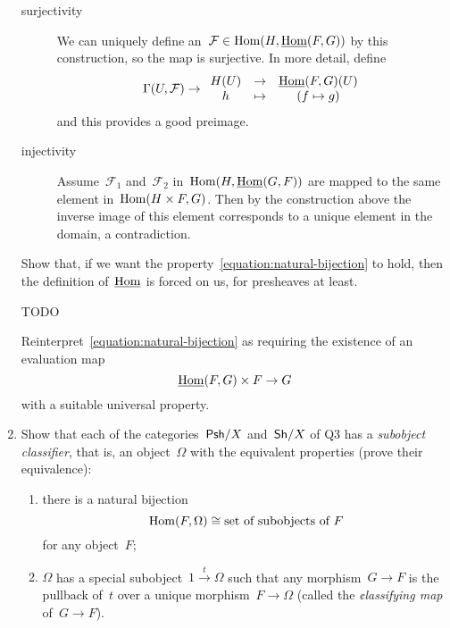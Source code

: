 \documentclass[a4paper,11pt,oneside,openany,article]{memoir}
\begin{document}
\begin{enumerate}
\begin{solution}
      \begin{description}
        \item[surjectivity] We can uniquely define an~$\mathcal{F}\in\operatorname{Hom}(H,\underline{\operatorname{Hom}}(F,G))$ by this construction, so the map is surjective. In more detail, define
          \begin{equation}
            \mathrm{\Gamma}(U,\mathcal{F})\to
            \begin{array}{ccc}
              H(U)&\to&\underline{\operatorname{Hom}}(F,G)(U) \\
              h&\mapsto& \left( f\mapsto g \right)
            \end{array}
          \end{equation}
          and this provides a good preimage.
        \item[injectivity] Assume~$\mathcal{F}_1$ and~$\mathcal{F}_2$ in~$\operatorname{Hom}(H,\underline{\operatorname{Hom}}(G,F))$ are mapped to the same element in~$\operatorname{Hom}(H\times F,G)$. Then by the construction above the inverse image of this element corresponds to a unique element in the domain, a contradiction.
      \end{description}
    \end{solution}

    Show that, if we want the property~\eqref{equation:natural-bijection} to hold, then the definition of~$\underline{\operatorname{Hom}}$ is forced on us, for presheaves at least.

    \begin{solution}
      TODO
    \end{solution}

    Reinterpret~\eqref{equation:natural-bijection} as requiring the existence of an evaluation map
    \begin{equation}
      \underline{\operatorname{Hom}}(F,G)\times F\to G
    \end{equation}
    with a suitable universal property.

  \item Show that each of the categories~$\mathsf{Psh}/X$ and~$\mathsf{Sh}/X$ of Q3 has a \emph{subobject classifier}, that is, an object~$\Omega$ with the equivalent properties (prove their equivalence):
    \begin{enumerate}
      \item\label{subobject-1} there is a natural bijection
        \begin{equation}
          \operatorname{Hom}(F,\Omega)\cong\text{set of subobjects of~$F$}
        \end{equation}
        for any object~$F$;
      \item\label{subobject-2} $\Omega$ has a special subobject~$\mathrm{1}\overset{t}{\to}\Omega$ such that any morphism~$G\to F$ is the pullback of~$t$ over a unique morphism~$F\to\Omega$ (called the \emph{¢lassifying map} of~$G\to F$).
    \end{enumerate}


\end{enumerate}
\end{document}
